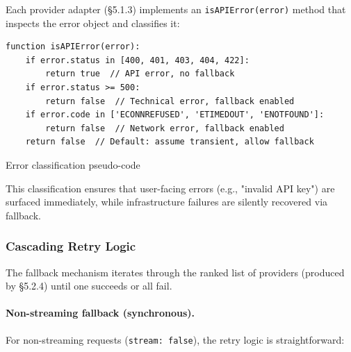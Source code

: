 \documentclass[english]{article}
\begin{document}
Each provider adapter (§5.1.3) implements an \texttt{isAPIError(error)} method that inspects the error object and classifies it:

\begin{listing}[H]
\begin{verbatim}
function isAPIError(error):
    if error.status in [400, 401, 403, 404, 422]:
        return true  // API error, no fallback
    if error.status >= 500:
        return false  // Technical error, fallback enabled
    if error.code in ['ECONNREFUSED', 'ETIMEDOUT', 'ENOTFOUND']:
        return false  // Network error, fallback enabled
    return false  // Default: assume transient, allow fallback
\end{verbatim}
\caption{Error classification pseudo-code}
\end{listing}

This classification ensures that user-facing errors (e.g., "invalid API key") are surfaced immediately, while infrastructure failures are silently recovered via fallback.

\subsubsection{Cascading Retry Logic}

The fallback mechanism iterates through the ranked list of providers (produced by §5.2.4) until one succeeds or all fail.

\paragraph{Non-streaming fallback (synchronous).}

For non-streaming requests (\texttt{stream: false}), the retry logic is straightforward:
\end{document}
